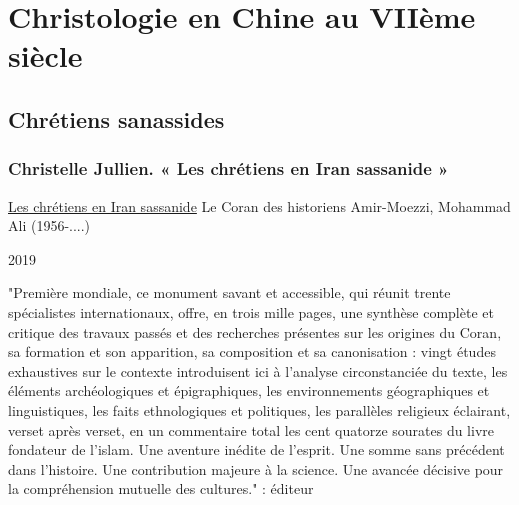 \chapter{Christologie en Chine au VIIème siècle}

\section{Chrétiens sanassides}

\subsection{Christelle Jullien. « Les chrétiens en Iran
sassanide »
}
\href{https://go.exlibris.link/YnGJKmGb}{Les chrétiens en Iran sassanide}
Le Coran des historiens
Amir-Moezzi, Mohammad Ali (1956-....)

2019

 "Première mondiale, ce monument savant et accessible, qui réunit trente spécialistes internationaux, offre, en trois mille pages, une synthèse complète et critique des travaux passés et des recherches présentes sur les origines du Coran, sa formation et son apparition, sa composition et sa canonisation : vingt études exhaustives sur le contexte introduisent ici à l'analyse circonstanciée du texte, les éléments archéologiques et épigraphiques, les environnements géographiques et linguistiques, les faits ethnologiques et politiques, les parallèles religieux éclairant, verset après verset, en un commentaire total les cent quatorze sourates du livre fondateur de l'islam. Une aventure inédite de l'esprit. Une somme sans précédent dans l'histoire. Une contribution majeure à la science. Une avancée décisive pour la compréhension mutuelle des cultures." : éditeur

